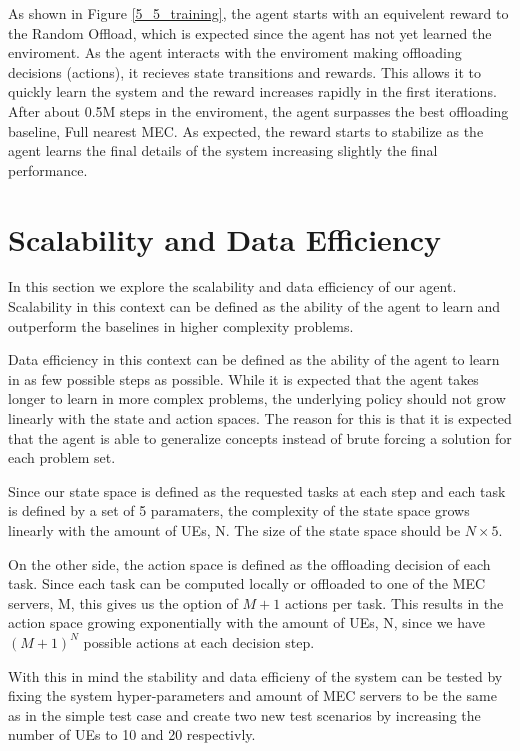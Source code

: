 As shown in Figure \ref{5_5_training}, the agent starts with an equivelent reward to the Random Offload, which is expected since the agent has not yet learned the enviroment. As the agent interacts with the enviroment making offloading decisions (actions), it recieves state transitions and rewards. This allows it to quickly learn the system and the reward increases rapidly in the first iterations. After about 0.5M steps in the enviroment, the agent surpasses the best offloading baseline, Full nearest MEC. As expected, the reward starts to stabilize as the agent learns the final details of the system increasing slightly the final performance.

\section{Scalability and Data Efficiency}

In this section we explore the scalability and data efficiency of our agent. Scalability in this context can be defined as the ability of the agent to learn and outperform the baselines in higher complexity problems. 

Data efficiency in this context can be defined as the ability of the agent to learn in as few possible steps as possible. While it is expected that the agent takes longer to learn in more complex problems, the underlying policy should not grow linearly with the state and action spaces. The reason for this is that it is expected that the agent is able to generalize concepts instead of brute forcing a solution for each problem set.

Since our state space is defined as the requested tasks at each step and each task is defined by a set of 5 paramaters, the complexity of the state space grows linearly with the amount of \acrshort{UE}s, N. The size of the state space should be $N \times 5$. 

On the other side, the action space is defined as the offloading decision of each task. Since each task can be computed locally or offloaded to one of the \acrshort{MEC} servers, M, this gives us the option of $M + 1$ actions per task. This results in the action space growing exponentially with the amount of \acrshort{UE}s, N, since we have $(M + 1)^N$ possible actions at each decision step.

With this in mind the stability and data efficieny of the system can be tested by fixing the system hyper-parameters and amount of \acrshort{MEC} servers to be the same as in the simple test case and create two new test scenarios by increasing the number of \acrshort{UE}s to 10 and 20 respectivly.

